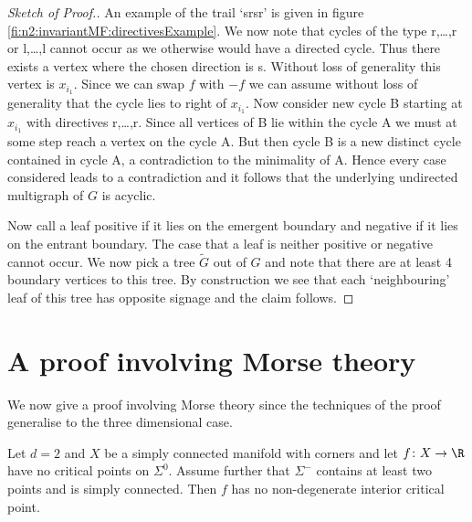 \begin{proof}[Sketch of Proof.]
  An example of the trail `srsr' is given in figure \ref{fi:n2:invariantMF:directivesExample}.
  We now note that cycles of the type r,\dots,r or l,\dots,l
  cannot occur as we otherwise would have a directed cycle. Thus there exists a vertex where the chosen direction is s. 
  Without loss of generality this vertex is $x_{i_1}$.
  Since we can swap $f$ with $-f$ we can assume without loss of generality that the cycle lies to right of $x_{i_1}$.
  Now consider new cycle B starting at $x_{i_1}$ with directives r,\dots,r.
  Since all vertices of B lie within the cycle A we must at some step reach a vertex on the cycle A. But then cycle B is a new distinct cycle
  contained in cycle A, a contradiction to the minimality of A.
  Hence every case considered leads to a contradiction and it follows that the underlying undirected multigraph of $G$
  is acyclic.
  
  Now call a leaf positive if it lies on the emergent boundary and
  negative if it lies on the entrant boundary. The case that a leaf is neither positive or negative cannot occur.
  We now pick a tree $\widetilde{G}$ out of $G$ and note that
  there are at least 4 boundary vertices to this tree.
  By construction we see that each `neighbouring' leaf of this tree
  has opposite signage and the claim follows.
\end{proof}


\section{A proof involving Morse theory}

We now give a proof involving Morse theory since the techniques of the proof generalise to the three dimensional case.
\begin{proposition}
  Let $d=2$ and $X$ be a simply connected manifold with corners and let $f\colon X\to\R$ have no critical points on $\Sigma^0$.
  Assume further that $\Sigma^-$ contains at least two points and is simply connected. Then $f$ has no non-degenerate interior critical point.
\end{proposition}

